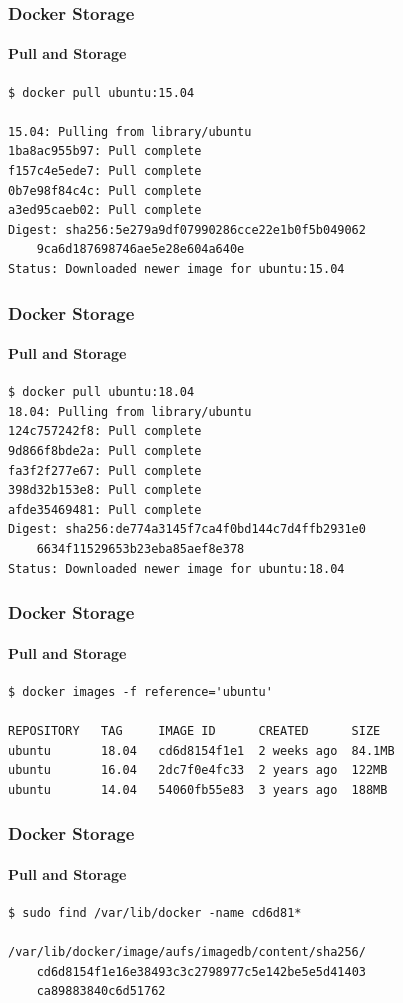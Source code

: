 \begin{frame}[fragile]
\frametitle{Docker Storage}
\framesubtitle{Pull and Storage}
\begin{lstlisting}
$ docker pull ubuntu:15.04

15.04: Pulling from library/ubuntu
1ba8ac955b97: Pull complete
f157c4e5ede7: Pull complete
0b7e98f84c4c: Pull complete
a3ed95caeb02: Pull complete
Digest: sha256:5e279a9df07990286cce22e1b0f5b049062
	9ca6d187698746ae5e28e604a640e
Status: Downloaded newer image for ubuntu:15.04
\end{lstlisting}
\end{frame}

\begin{frame}[fragile]
\frametitle{Docker Storage}
\framesubtitle{Pull and Storage}
\begin{lstlisting}
$ docker pull ubuntu:18.04
18.04: Pulling from library/ubuntu
124c757242f8: Pull complete
9d866f8bde2a: Pull complete
fa3f2f277e67: Pull complete
398d32b153e8: Pull complete
afde35469481: Pull complete
Digest: sha256:de774a3145f7ca4f0bd144c7d4ffb2931e0
	6634f11529653b23eba85aef8e378
Status: Downloaded newer image for ubuntu:18.04
\end{lstlisting}
\end{frame}


\begin{frame}[fragile]
\frametitle{Docker Storage}
\framesubtitle{Pull and Storage}
\begin{lstlisting}
$ docker images -f reference='ubuntu'

REPOSITORY   TAG     IMAGE ID      CREATED      SIZE
ubuntu       18.04   cd6d8154f1e1  2 weeks ago  84.1MB
ubuntu       16.04   2dc7f0e4fc33  2 years ago  122MB
ubuntu       14.04   54060fb55e83  3 years ago  188MB
\end{lstlisting}
\end{frame}

\begin{frame}[fragile]
\frametitle{Docker Storage}
\framesubtitle{Pull and Storage}
\begin{lstlisting}
$ sudo find /var/lib/docker -name cd6d81*

/var/lib/docker/image/aufs/imagedb/content/sha256/
	cd6d8154f1e16e38493c3c2798977c5e142be5e5d41403
	ca89883840c6d51762

\end{lstlisting}
\end{frame}

